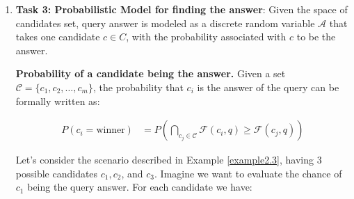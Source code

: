\begin{enumerate}
\begin{example}
        
        \begin{align*}
            \mathcal{F}(c_1, q) = 
            &R(\text{HNY}) + R(\text{MLN}) + R(\text{HYN}) + D(\text{HNY, MLN}) \\
            &+ D(\text{HNY, HYN}) + D(\text{MLN, HYN})
        \end{align*}

    
        To find the lowest and highest possible scores of $c_1$, we should replace known values from \autoref{tab:ny_hotels_relevance} and \autoref{tab:ny_hotels_diversity} in the above formula and substitute unknown values in the formula with minimum and maximum possible response values which are assumed to be 0 and 1 respectively. Therefore, we can compute the minimum and maximum overall scores of $c_1$:
\[
\mathcal{F}_{\text{min}}(c_1, q) = R(\text{HNY}) + R(\text{MLN}) + 0 + D(\text{HNY, MLN}) + 0 + 0
\]
\[
\mathcal{F}_{\text{min}}(c_1, q) = 0.5 + 1.0 + 0 + 0.5 + 0 + 0 = 2.0
\]

\[
\mathcal{F}_{\text{max}}(c_1, q) = R(\text{HNY}) + R(\text{MLN}) + 1 + D(\text{HNY, MLN}) + 1 + 1
\]
\[
\mathcal{F}_{\text{max}}(c_1, q) = 0.5 + 1.0 + 1 + 0.5 + 1 + 1 = 5.0
\]

Therefore, the lower bound (LB) and upper bound (UB) of \( c_1 \) are:
\begin{align*}
    (\text{LB, UB})_{c_1} &= (2.0, 5.0)
\end{align*}
    
    \end{example}

   
    \item \textbf{Task 3: Probabilistic Model for finding the answer}: 
Given the space of candidates set, query answer is modeled as a discrete random variable $\mathcal{A}$ that takes one candidate $c \in C$, with the probability associated with $c$ to be the answer.
  \begin{definition}
    {\bf Probability of a candidate being the answer.} Given a set $\mathcal{C} = 
    \{c_1, c_2, \ldots, c_m\}$, the probability that $c_i$ is the answer of the query can be formally written as: 
    
    \begin{align*}
    P(c_i = \text{winner}) &= P\left(\bigcap_{c_j \in \mathcal{C}} \mathcal{F}(c_i, q) \geq \mathcal{F}(c_j, q)\right)
\end{align*}

\end{definition}

    \begin{example}
    Let's consider the scenario described in Example \ref{example2.3}, having 3 possible candidates $c_1, c_2$, and $c_3$. Imagine we want to evaluate the chance of $c_1$ being the query answer. For each candidate we have:


\end{example}
\end{enumerate}
